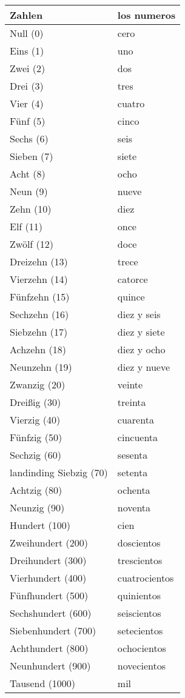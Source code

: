 \documentclass{spanish_summary}
\begin{document}
\begin{longtable}{p{} | p{}} 
\textbf{Zahlen}     & \textbf{los numeros}                                       \\ \hline
\hline
\endhead %
Null (0) & cero \\
Eins (1) & uno \\
Zwei (2) & dos \\
Drei (3) & tres \\
Vier (4) & cuatro \\
Fünf (5) & cinco \\
Sechs (6) & seis \\
Sieben (7) & siete \\
Acht (8) & ocho \\
Neun (9) & nueve \\
Zehn (10) & diez \\
Elf (11) & once \\
Zwölf (12) & doce \\
Dreizehn (13) & trece \\
Vierzehn (14) & catorce \\
Fünfzehn (15) & quince \\
Sechzehn (16) & diez y seis\\
Siebzehn (17) & diez y siete \\
Achzehn (18) & diez y ocho \\
Neunzehn (19) & diez y nueve \\
Zwanzig (20) & veinte \\
Dreißig (30) & treinta \\
Vierzig (40) & cuarenta \\
Fünfzig (50) & cincuenta \\
Sechzig (60) & sesenta \\landinding
Siebzig (70) & setenta \\
Achtzig (80) & ochenta  \\
Neunzig (90) & noventa \\
Hundert (100) & cien \\
Zweihundert (200) & doscientos \\
Dreihundert (300) & trescientos \\
Vierhundert (400) & cuatrocientos \\
Fünfhundert (500) & quinientos \\
Sechshundert (600) & seiscientos \\
Siebenhundert (700) & setecientos \\
Achthundert (800) & ochocientos \\
Neunhundert (900) & novecientos \\
Tausend (1000) & mil \\

\end{longtable}
\end{document}

